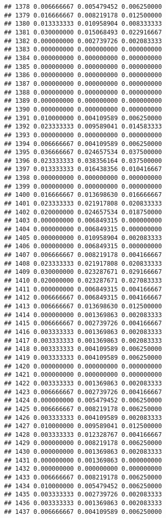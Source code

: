 \documentclass[
]{article}
\begin{document}
\begin{verbatim}
## 1378 0.006666667 0.005479452 0.006250000
## 1379 0.016666667 0.008219178 0.012500000
## 1380 0.013333333 0.010958904 0.008333333
## 1381 0.030000000 0.015068493 0.022916667
## 1382 0.000000000 0.002739726 0.002083333
## 1383 0.000000000 0.000000000 0.000000000
## 1384 0.000000000 0.000000000 0.000000000
## 1385 0.000000000 0.000000000 0.000000000
## 1386 0.000000000 0.000000000 0.000000000
## 1387 0.000000000 0.000000000 0.000000000
## 1388 0.000000000 0.000000000 0.000000000
## 1389 0.000000000 0.000000000 0.000000000
## 1390 0.000000000 0.000000000 0.000000000
## 1391 0.010000000 0.004109589 0.006250000
## 1392 0.023333333 0.009589041 0.014583333
## 1393 0.000000000 0.000000000 0.000000000
## 1394 0.006666667 0.004109589 0.006250000
## 1395 0.036666667 0.024657534 0.037500000
## 1396 0.023333333 0.038356164 0.037500000
## 1397 0.013333333 0.016438356 0.010416667
## 1398 0.000000000 0.000000000 0.000000000
## 1399 0.000000000 0.000000000 0.000000000
## 1400 0.016666667 0.013698630 0.016666667
## 1401 0.023333333 0.021917808 0.020833333
## 1402 0.020000000 0.024657534 0.018750000
## 1403 0.000000000 0.006849315 0.000000000
## 1404 0.000000000 0.006849315 0.000000000
## 1405 0.000000000 0.010958904 0.002083333
## 1406 0.000000000 0.006849315 0.000000000
## 1407 0.006666667 0.008219178 0.004166667
## 1408 0.023333333 0.021917808 0.020833333
## 1409 0.030000000 0.023287671 0.029166667
## 1410 0.020000000 0.023287671 0.027083333
## 1411 0.000000000 0.006849315 0.004166667
## 1412 0.006666667 0.006849315 0.004166667
## 1413 0.006666667 0.013698630 0.012500000
## 1414 0.000000000 0.001369863 0.002083333
## 1415 0.006666667 0.002739726 0.004166667
## 1416 0.003333333 0.001369863 0.002083333
## 1417 0.003333333 0.001369863 0.002083333
## 1418 0.003333333 0.004109589 0.006250000
## 1419 0.003333333 0.004109589 0.006250000
## 1420 0.000000000 0.000000000 0.000000000
## 1421 0.000000000 0.000000000 0.000000000
## 1422 0.003333333 0.001369863 0.002083333
## 1423 0.006666667 0.002739726 0.004166667
## 1424 0.000000000 0.005479452 0.006250000
## 1425 0.006666667 0.008219178 0.006250000
## 1426 0.003333333 0.004109589 0.002083333
## 1427 0.010000000 0.009589041 0.012500000
## 1428 0.003333333 0.012328767 0.004166667
## 1429 0.000000000 0.008219178 0.006250000
## 1430 0.000000000 0.001369863 0.002083333
## 1431 0.000000000 0.001369863 0.000000000
## 1432 0.000000000 0.000000000 0.000000000
## 1433 0.006666667 0.008219178 0.006250000
## 1434 0.010000000 0.005479452 0.006250000
## 1435 0.003333333 0.002739726 0.002083333
## 1436 0.003333333 0.001369863 0.002083333
## 1437 0.006666667 0.004109589 0.006250000

\end{verbatim}
\end{document}
